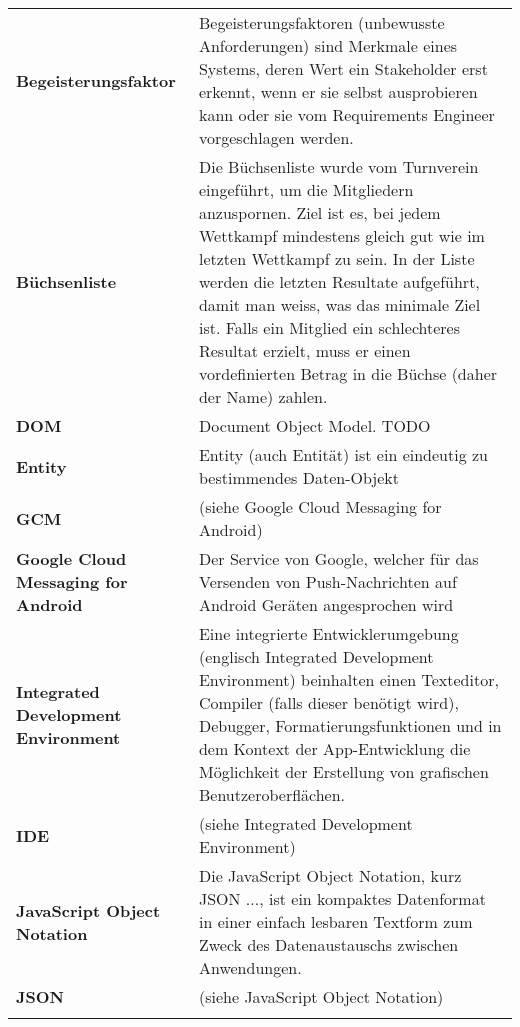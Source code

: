 \begin{longtable}{>{\raggedright}m{3cm}m{11cm}}
	\textbf{Begeisterungsfaktor}&
	Begeisterungsfaktoren (unbewusste Anforderungen) sind Merkmale eines Systems, deren Wert ein Stakeholder erst erkennt, wenn er sie selbst ausprobieren kann oder sie vom Requirements Engineer vorgeschlagen werden.\cite{req_eng_book}\\ \addlinespace

	\textbf{Büchsenliste}&
	Die Büchsenliste wurde vom Turnverein eingeführt, um die Mitgliedern anzuspornen. Ziel ist es, bei jedem Wettkampf mindestens gleich gut wie im letzten Wettkampf zu sein. In der Liste werden die letzten Resultate aufgeführt, damit man weiss, was das minimale Ziel ist. Falls ein Mitglied ein schlechteres Resultat erzielt, muss er einen vordefinierten Betrag in die Büchse (daher der Name) zahlen.\\ \addlinespace

	\textbf{DOM}&
	Document Object Model. TODO \\ \addlinespace

	\textbf{Entity}&
	Entity (auch Entität) ist ein eindeutig zu bestimmendes Daten-Objekt \\ \addlinespace

	\textbf{GCM}&
	(siehe Google Cloud Messaging for Android)\\ \addlinespace

	\textbf{Google Cloud Messaging for Android}&
	Der Service von Google, welcher für das Versenden von Push-Nachrichten auf Android Geräten angesprochen wird\\ \addlinespace

	\textbf{Integrated Development Environment}&
	Eine integrierte Entwicklerumgebung (englisch Integrated Development Environment) beinhalten einen Texteditor, Compiler (falls dieser benötigt wird), Debugger, Formatierungsfunktionen und in dem Kontext der App-Entwicklung die Möglichkeit der Erstellung von grafischen Benutzeroberflächen.\\ \addlinespace

	\textbf{IDE}&
	(siehe Integrated Development Environment)\\ \addlinespace

	\textbf{JavaScript Object Notation}&
	Die JavaScript Object Notation, kurz JSON ..., ist ein kompaktes Datenformat in einer einfach lesbaren Textform zum Zweck des Datenaustauschs zwischen Anwendungen.\cite{wiki_json}\\ \addlinespace

	\textbf{JSON}&
	(siehe JavaScript Object Notation)\\ \addlinespace


\end{longtable}
